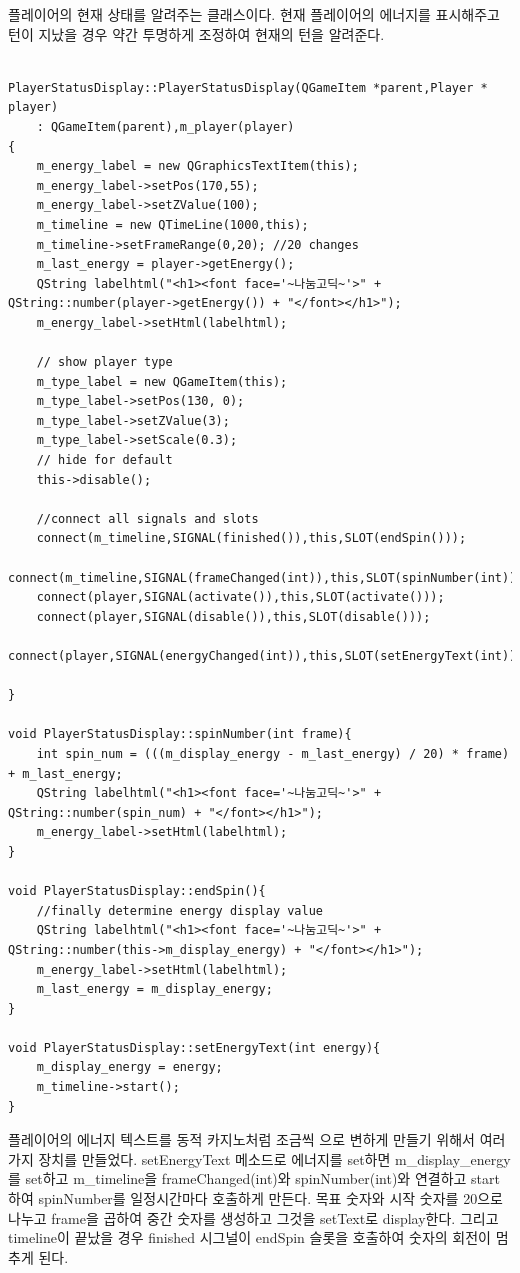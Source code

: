 \documentclass[10pt,oneside,a4paper,titlepage]{article}
\begin{document}
플레이어의 현재 상태를 알려주는 클래스이다. 현재 플레이어의 에너지를 표시해주고 턴이 지났을 경우 약간 투명하게 조정하여 현재의 턴을 알려준다. \\

\begin{lstlisting}[frame=single,caption=
{PlayerStatusDisplay text display},label=code:FD,captionpos=b,framexleftmargin=10pt,escapeinside=~~]

PlayerStatusDisplay::PlayerStatusDisplay(QGameItem *parent,Player * player)
    : QGameItem(parent),m_player(player)
{
    m_energy_label = new QGraphicsTextItem(this);
    m_energy_label->setPos(170,55);
    m_energy_label->setZValue(100);
    m_timeline = new QTimeLine(1000,this);
    m_timeline->setFrameRange(0,20); //20 changes
    m_last_energy = player->getEnergy();
    QString labelhtml("<h1><font face='~나눔고딕~'>" + QString::number(player->getEnergy()) + "</font></h1>");
    m_energy_label->setHtml(labelhtml);

    // show player type
    m_type_label = new QGameItem(this);
    m_type_label->setPos(130, 0);
    m_type_label->setZValue(3);
    m_type_label->setScale(0.3);
    // hide for default
    this->disable();

    //connect all signals and slots
    connect(m_timeline,SIGNAL(finished()),this,SLOT(endSpin()));
    connect(m_timeline,SIGNAL(frameChanged(int)),this,SLOT(spinNumber(int)));
    connect(player,SIGNAL(activate()),this,SLOT(activate()));
    connect(player,SIGNAL(disable()),this,SLOT(disable()));
    connect(player,SIGNAL(energyChanged(int)),this,SLOT(setEnergyText(int)));

}

void PlayerStatusDisplay::spinNumber(int frame){
    int spin_num = (((m_display_energy - m_last_energy) / 20) * frame) + m_last_energy;
    QString labelhtml("<h1><font face='~나눔고딕~'>" + QString::number(spin_num) + "</font></h1>");
    m_energy_label->setHtml(labelhtml);
}

void PlayerStatusDisplay::endSpin(){
    //finally determine energy display value
    QString labelhtml("<h1><font face='~나눔고딕~'>" + QString::number(this->m_display_energy) + "</font></h1>");
    m_energy_label->setHtml(labelhtml);
    m_last_energy = m_display_energy;
}

void PlayerStatusDisplay::setEnergyText(int energy){
    m_display_energy = energy;
    m_timeline->start();
}
\end{lstlisting}

플레이어의 에너지 텍스트를 동적 카지노처럼 조금씩 으로 변하게 만들기 위해서 여러가지 장치를 만들었다. setEnergyText 메소드로 에너지를 set하면 m\_display\_energy 를 set하고 m\_timeline을 frameChanged(int)와 spinNumber(int)와 연결하고 start하여 spinNumber를 일정시간마다 호출하게 만든다. 목표 숫자와 시작 숫자를 20으로 나누고 frame을 곱하여 중간 숫자를 생성하고 그것을 setText로 display한다. 그리고 timeline이 끝났을 경우 finished 시그널이 endSpin 슬롯을 호출하여 숫자의 회전이 멈추게 된다. \\
\end{document}
